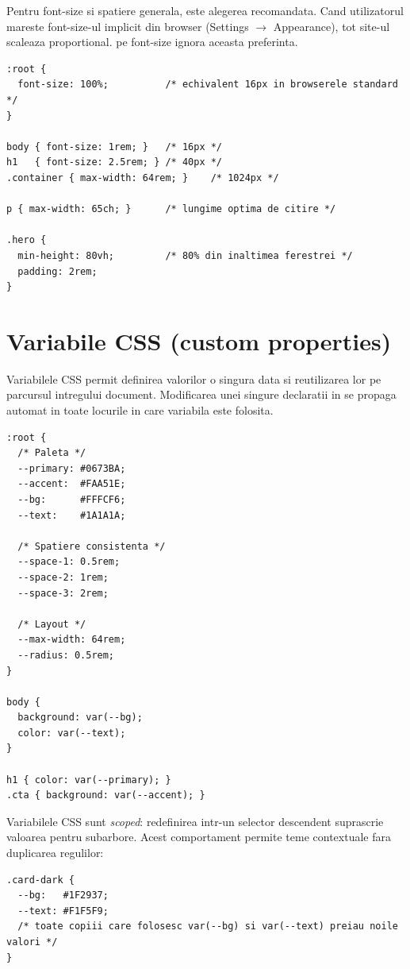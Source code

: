 \begin{ponturi}
Pentru font-size si spatiere generala,  este alegerea recomandata. Cand utilizatorul mareste font-size-ul implicit din browser (Settings $\to$ Appearance), tot site-ul scaleaza proportional.  pe font-size ignora aceasta preferinta.
\end{ponturi}

\begin{lstlisting}[style=css, caption={Compunere uzuala}]
:root {
  font-size: 100%;          /* echivalent 16px in browserele standard */
}

body { font-size: 1rem; }   /* 16px */
h1   { font-size: 2.5rem; } /* 40px */
.container { max-width: 64rem; }    /* 1024px */

p { max-width: 65ch; }      /* lungime optima de citire */

.hero {
  min-height: 80vh;         /* 80% din inaltimea ferestrei */
  padding: 2rem;
}
\end{lstlisting}

\section{Variabile CSS (custom properties)}

Variabilele CSS permit definirea valorilor o singura data si reutilizarea lor pe parcursul intregului document. Modificarea unei singure declaratii in  se propaga automat in toate locurile in care variabila este folosita.

\begin{lstlisting}[style=css]
:root {
  /* Paleta */
  --primary: #0673BA;
  --accent:  #FAA51E;
  --bg:      #FFFCF6;
  --text:    #1A1A1A;

  /* Spatiere consistenta */
  --space-1: 0.5rem;
  --space-2: 1rem;
  --space-3: 2rem;

  /* Layout */
  --max-width: 64rem;
  --radius: 0.5rem;
}

body {
  background: var(--bg);
  color: var(--text);
}

h1 { color: var(--primary); }
.cta { background: var(--accent); }
\end{lstlisting}

Variabilele CSS sunt \emph{scoped}: redefinirea intr-un selector descendent suprascrie valoarea pentru subarbore. Acest comportament permite teme contextuale fara duplicarea regulilor:

\begin{lstlisting}[style=css, caption={Tema schimbata local}]
.card-dark {
  --bg:   #1F2937;
  --text: #F1F5F9;
  /* toate copiii care folosesc var(--bg) si var(--text) preiau noile valori */
}
\end{lstlisting}

